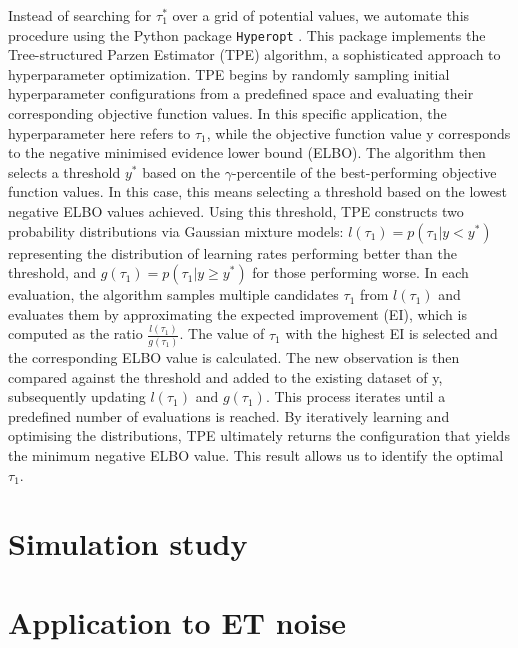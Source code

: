\documentclass[%
 reprint,
 amsmath,amssymb,
 aps,
]{revtex4-2}
\begin{document}
Instead of searching for $\tau_1^*$ over a grid of potential values, we automate this procedure using the Python package \texttt{Hyperopt} \cite{Bergstra2013}. This package implements the Tree-structured Parzen Estimator (TPE) algorithm, a sophisticated approach to hyperparameter optimization. TPE begins by randomly sampling initial hyperparameter configurations from a predefined space and evaluating their corresponding objective function values. In this specific application, the hyperparameter here refers to $\tau_1$, while the objective function value y corresponds to the negative minimised evidence lower bound (ELBO). The algorithm then selects a threshold $y^*$ based on the $\gamma$-percentile of the best-performing objective function values. In this case, this means selecting a threshold based on the lowest negative ELBO values achieved. Using this threshold, TPE constructs two probability distributions via Gaussian mixture models: $l(\tau_1) = p(\tau_1|y < y^*)$ representing the distribution of learning rates performing better than the threshold, and $g(\tau_1) = p(\tau_1|y \geq y^*)$ for those performing worse. In each evaluation, the algorithm samples multiple candidates $\tau_1$ from $l(\tau_1)$ and evaluates them by approximating the expected improvement (EI), which is computed as the ratio $\frac{l(\tau_1)}{g(\tau_1)}$. The value of $\tau_1$ with the highest EI is selected and the corresponding ELBO value is calculated. The new observation is then compared against the threshold and added to the existing dataset of y, subsequently updating $l(\tau_1)$ and $g(\tau_1)$. This process iterates until a predefined number of evaluations is reached. By iteratively learning and optimising the distributions, TPE ultimately returns the configuration that yields the minimum negative ELBO value. This result allows us to identify the optimal $\tau_1$.


\section{Simulation study}
\label{sec:simulation}


\section{Application to ET noise}
\label{sec:application}
\end{document}
